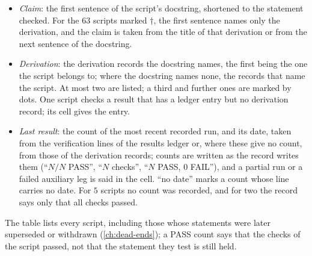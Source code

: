 \begin{itemize}
  \setlength{\itemsep}{0.5ex}

  \item \emph{Claim}: the first sentence of the script's docstring, shortened to the statement checked.
    For the $63$ scripts marked $\dagger$, the first sentence names only the derivation, and the claim is taken from the title of that derivation or from the next sentence of the docstring.

  \item \emph{Derivation}: the derivation records the docstring names, the first being the one the script belongs to; where the docstring names none, the records that name the script.
    At most two are listed; a third and further ones are marked by dots.
    One script checks a result that has a ledger entry but no derivation record; its cell gives the entry.

  \item \emph{Last result}: the count of the most recent recorded run, and its date, taken from the verification lines of the results ledger or, where these give no count, from those of the derivation records; counts are written as the record writes them (\enquote{$N/N$ PASS}, \enquote{$N$ checks}, \enquote{$N$ PASS, $0$ FAIL}), and a partial run or a failed auxiliary leg is said in the cell.
    \enquote{no date} marks a count whose line carries no date.
    For $5$ scripts no count was recorded, and for two the record says only that all checks passed.
\end{itemize}

The table lists every script, including those whose statements were later superseded or withdrawn (\cref{ch:dead-ends}); a PASS count says that the checks of the script passed, not that the statement they test is still held.

